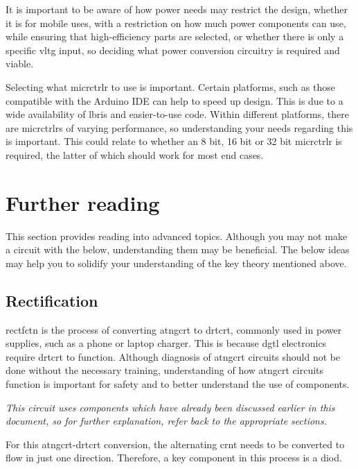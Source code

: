 \documentclass[a4paper,11pt]{report}
\newcommand{\Theory}[1] %
{
\phantomsection %
\todo[inline, color=green!30]{\textbf{#1}} %
\vspace{1em} %
}
\begin{document}
It is important to be aware of how power needs may restrict the design, whether it is for mobile uses, with a restriction on how much power components can use, while ensuring that high-efficiency parts are selected, or whether there is only a specific \gls{vltg} input, so deciding what power conversion circuitry is required and viable.

Selecting what \gls{micrctrlr} to use is important. Certain platforms, such as those compatible with the Arduino IDE can help to speed up design. This is due to a wide availability of \gls{lbris} and easier-to-use code. Within different platforms, there are \gls{micrctrlr}s of varying performance, so understanding your needs regarding this is important. This could relate to whether an 8 bit, 16 bit or 32 bit \gls{micrctrlr} is required, the latter of which should work for most end cases.

\pagebreak

\section{Further reading}

This section provides reading into advanced topics. Although you may not make a circuit with the below, understanding them may be beneficial. The below ideas may help you to solidify your understanding of the key theory mentioned above.

\vspace*{1\baselineskip}

\subsection{Rectification}

\Theory{What is \gls{rectfctn}?}

\gls{rectfctn} is the process of converting \gls{atngcrt} to \gls{drtcrt}, commonly used in power supplies, such as a phone or laptop charger. This is because \gls{dgtl} electronics require \gls{drtcrt} to function. Although diagnosis of \gls{atngcrt} circuits should not be done without the necessary training, understanding of how \gls{atngcrt} circuits function is important for safety and to better understand the use of components.

\textit{This circuit uses components which have already been discussed earlier in this document, so for further explanation, refer back to the appropriate sections.}

For this \gls{atngcrt}-\gls{drtcrt} conversion, the alternating \gls{crnt} needs to be converted to flow in just one direction. Therefore, a key component in this process is a \gls{diod}.
\end{document}
